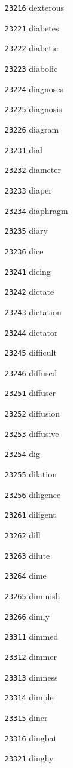 \documentclass[twoside,11pt]{article}
\begin{document}
\begin{multicols}{5}
\begin{enumerate}
\item[\texttt{23216}] dexterous
\item[\texttt{23221}] diabetes
\item[\texttt{23222}] diabetic
\item[\texttt{23223}] diabolic
\item[\texttt{23224}] diagnoses
\item[\texttt{23225}] diagnosis
\item[\texttt{23226}] diagram
\item[\texttt{23231}] dial
\item[\texttt{23232}] diameter
\item[\texttt{23233}] diaper
\item[\texttt{23234}] diaphragm
\item[\texttt{23235}] diary
\item[\texttt{23236}] dice
\item[\texttt{23241}] dicing
\item[\texttt{23242}] dictate
\item[\texttt{23243}] dictation
\item[\texttt{23244}] dictator
\item[\texttt{23245}] difficult
\item[\texttt{23246}] diffused
\item[\texttt{23251}] diffuser
\item[\texttt{23252}] diffusion
\item[\texttt{23253}] diffusive
\item[\texttt{23254}] dig
\item[\texttt{23255}] dilation
\item[\texttt{23256}] diligence
\item[\texttt{23261}] diligent
\item[\texttt{23262}] dill
\item[\texttt{23263}] dilute
\item[\texttt{23264}] dime
\item[\texttt{23265}] diminish
\item[\texttt{23266}] dimly
\item[\texttt{23311}] dimmed
\item[\texttt{23312}] dimmer
\item[\texttt{23313}] dimness
\item[\texttt{23314}] dimple
\item[\texttt{23315}] diner
\item[\texttt{23316}] dingbat
\item[\texttt{23321}] dinghy

\end{enumerate}
\end{multicols}
\end{document}
